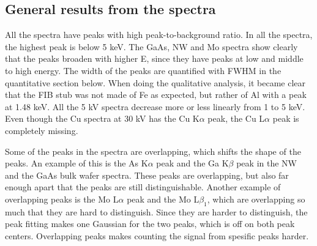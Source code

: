 %
%
%
%
%
%
%
%
%
%
%
%
%
%
%

\subsection{General results from the spectra}
\label{sec:results:qualitative:general}

All the spectra have peaks with high peak-to-background ratio. %
In all the spectra, the highest peak is below 5 keV. %
The GaAs, NW and Mo spectra show clearly that the peaks broaden with higher E, since they have peaks at low and middle to high energy. %
The width of the peaks are quantified with FWHM in the quantitative section below.
When doing the qualitative analysis, it became clear that the FIB stub was not made of Fe as expected, but rather of Al with a peak at 1.48 keV.
All the 5 kV spectra decrease more or less linearly from 1 to 5 keV. %
Even though the Cu spectra at 30 kV has the Cu K$\alpha$ peak, the Cu L$\alpha$ peak is completely missing. %

Some of the peaks in the spectra are overlapping, which shifts the shape of the peaks.
An example of this is the As K$\alpha$ peak and the Ga K$\beta$ peak in the NW and the GaAs bulk wafer spectra.
These peaks are overlapping, but also far enough apart that the peaks are still distinguishable.
Another example of overlapping peaks is the Mo L$\alpha$ peak and the Mo L$\beta_1$, which are overlapping so much that they are hard to distinguish.
Since they are harder to distinguish, the peak fitting makes one Gaussian for the two peaks, which is off on both peak centers. %
Overlapping peaks makes counting the signal from spesific peaks harder.

